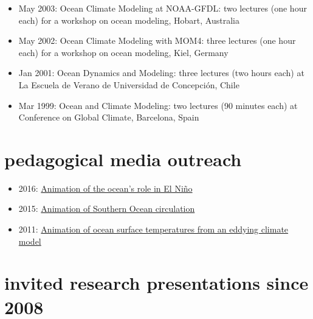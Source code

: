 \documentclass{article}
\begin{document}
\begin{itemize}[leftmargin=*]
\item May 2003: {\sc Ocean Climate Modeling at NOAA-GFDL}: two lectures (one hour each) for a workshop on ocean modeling, Hobart, Australia

\item May 2002: {\sc Ocean Climate Modeling with MOM4}: three lectures (one hour each) for a workshop on ocean modeling, Kiel, Germany

\item Jan 2001: {\sc Ocean Dynamics and Modeling}: three lectures (two hours each) at La Escuela de Verano de Universidad de Concepci\'on, Chile

\item Mar 1999: {\sc Ocean and Climate Modeling}: two lectures (90 minutes each) at {\sc Conference on Global Climate}, Barcelona,
Spain

\end{itemize}



\section*{\sc  \color{Maroon} pedagogical media outreach}
\vspace{-.3cm}

\begin{itemize}[leftmargin=*]

\item 2016: \href{https://www.youtube.com/watch?v=gaFjlZxM7S4&feature=youtu.be}{Animation of  the ocean's role in El Ni\~{n}o} 

\item 2015:  \href{https://www.youtube.com/watch?v=8VMSF28J9H4&list=PL9poquLHLLO91iC_6pujn6bsMCvMyJ3xU}{Animation  of  Southern Ocean circulation} 

\item 2011:  \href{https://vimeo.com/27076776}{Animation  of  ocean surface temperatures from an eddying climate model} 

\end{itemize}



\section*{\sc \color{Maroon} invited research presentations since 2008}
\vspace{-.3cm}
\end{document}
